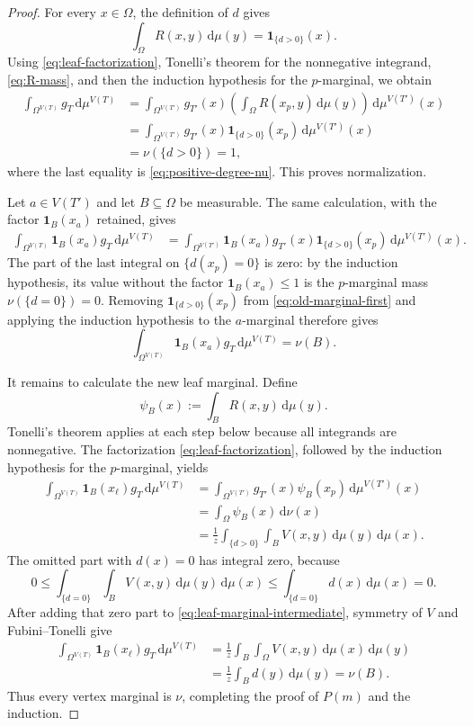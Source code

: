 \documentclass[11pt]{article}
\newcommand{\dd}{\,\mathrm{d}}
\newcommand{\one}{\mathbf{1}}
\begin{document}
\begin{proof}
For every $x\in\Omega$, the definition of $d$ gives
\begin{equation}
\int_\Omega R(x,y)\dd\mu(y)=\one_{\{d>0\}}(x).
\label{eq:R-mass}
\end{equation}
Using \eqref{eq:leaf-factorization}, Tonelli's theorem for the
nonnegative integrand, \eqref{eq:R-mass}, and then the induction
hypothesis for the $p$-marginal, we obtain
\begin{align*}
\int_{\Omega^{V(T)}}g_T\dd\mu^{V(T)}
&=\int_{\Omega^{V(T')}}g_{T'}(x)
\left(\int_\Omega R(x_p,y)\dd\mu(y)\right)
\dd\mu^{V(T')}(x)
\\
&=\int_{\Omega^{V(T')}}g_{T'}(x)
\one_{\{d>0\}}(x_p)\dd\mu^{V(T')}(x)
\\
&=\nu(\{d>0\})=1,
\end{align*}
where the last equality is \eqref{eq:positive-degree-nu}.  This proves
normalization.

Let $a\in V(T')$ and let $B\subseteq\Omega$ be measurable.  The same
calculation, with the factor $\one_B(x_a)$ retained, gives
\begin{align}
\int_{\Omega^{V(T)}}\one_B(x_a)g_T\dd\mu^{V(T)}
&=\int_{\Omega^{V(T')}}\one_B(x_a)g_{T'}(x)
\one_{\{d>0\}}(x_p)\dd\mu^{V(T')}(x).
\label{eq:old-marginal-first}
\end{align}
The part of the last integral on $\{d(x_p)=0\}$ is zero: by the
induction hypothesis, its value without the factor
$\one_B(x_a)\leq1$ is the $p$-marginal mass
$\nu(\{d=0\})=0$.  Removing $\one_{\{d>0\}}(x_p)$ from
\eqref{eq:old-marginal-first} and applying the induction hypothesis to
the $a$-marginal therefore gives
\[
\int_{\Omega^{V(T)}}\one_B(x_a)g_T\dd\mu^{V(T)}=\nu(B).
\]

It remains to calculate the new leaf marginal.  Define
\[
\psi_B(x):=\int_B R(x,y)\dd\mu(y).
\]
Tonelli's theorem applies at each step below because all integrands are
nonnegative.  The factorization \eqref{eq:leaf-factorization}, followed
by the induction hypothesis for the $p$-marginal, yields
\begin{align}
\int_{\Omega^{V(T)}}\one_B(x_\ell)g_T\dd\mu^{V(T)}
&=\int_{\Omega^{V(T')}}g_{T'}(x)\psi_B(x_p)
\dd\mu^{V(T')}(x)
\\
&=\int_\Omega\psi_B(x)\dd\nu(x)
\\
&=\frac1z\int_{\{d>0\}}\int_B V(x,y)\dd\mu(y)\dd\mu(x).
\label{eq:leaf-marginal-intermediate}
\end{align}
The omitted part with $d(x)=0$ has integral zero, because
\[
0\leq\int_{\{d=0\}}\int_B V(x,y)\dd\mu(y)\dd\mu(x)
\leq\int_{\{d=0\}}d(x)\dd\mu(x)=0.
\]
After adding that zero part to \eqref{eq:leaf-marginal-intermediate},
symmetry of $V$ and Fubini--Tonelli give
\begin{align*}
\int_{\Omega^{V(T)}}\one_B(x_\ell)g_T\dd\mu^{V(T)}
&=\frac1z\int_B\int_\Omega V(x,y)\dd\mu(x)\dd\mu(y)
\\
&=\frac1z\int_B d(y)\dd\mu(y)
=\nu(B).
\end{align*}
Thus every vertex marginal is $\nu$, completing the proof of $P(m)$
and the induction.
\end{proof}
\end{document}
